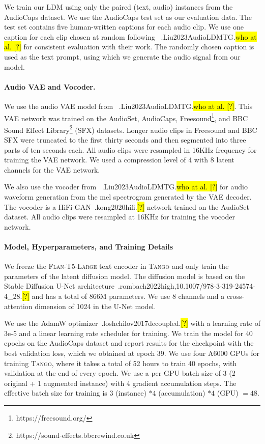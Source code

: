 \documentclass{article}
\newcommand{\model}{\textsc{Tango}}
\let\realcite\cite
\renewcommand{\cite}[1]{\ifx.#1.\hl{[?]}\else\realcite{#1}\fi}
\let\realcitet\citet
\renewcommand{\citet}[1]{\ifx.#1.\hl{who at al. [?]}\else\realcitet{#1}\fi}
\begin{document}
We train our LDM using only the paired (text, audio) instances from the AudioCaps dataset. We use the AudioCaps test set as our evaluation data. The test set contains five human-written captions for each audio clip. We use one caption for each clip chosen at random following ~\citet{Liu2023AudioLDMTG} for consistent evaluation with their work. The randomly chosen caption is used as the text prompt, using which we generate the audio signal from our model.

\paragraph{Audio VAE and Vocoder.}
We use the audio VAE model from ~\citet{Liu2023AudioLDMTG}. This VAE network was trained on the AudioSet, AudioCaps, Freesound\footnote{https://freesound.org/}, and BBC Sound Effect Library\footnote{https://sound-effects.bbcrewind.co.uk} (SFX) datasets. Longer audio clips in Freesound and BBC SFX were truncated to the first thirty seconds and then segmented into three parts of ten seconds each. All audio clips were resampled in 16KHz frequency for training the VAE network. We used a compression level of 4 with 8 latent channels for the VAE network. 

We also use the vocoder from ~\citet{Liu2023AudioLDMTG} for audio waveform generation from the mel spectrogram generated by the VAE decoder. The vocoder is a HiFi-GAN~\cite{kong2020hifi} network trained on the AudioSet dataset. All audio clips were resampled at 16KHz for training the vocoder network.

\paragraph{Model, Hyperparameters, and Training Details}
We freeze the \textsc{Flan-T5-Large} text encoder in \model{} and only train the parameters of the latent diffusion model. The diffusion model is based on the Stable Diffusion U-Net architecture~\cite{rombach2022high,10.1007/978-3-319-24574-4_28} and has a total of 866M parameters. We use 8 channels and a cross-attention dimension of 1024 in the U-Net model.

We use the AdamW optimizer~\cite{loshchilov2017decoupled} with a learning rate of 3e-5 and a linear learning rate scheduler for training. We train the model for 40 epochs on the AudioCaps dataset and report results for the checkpoint with the best validation loss, which we obtained at epoch 39. We use four A6000 GPUs for training \model{}, where it takes a total of 52 hours to train 40 epochs, with validation at the end of every epoch. We use a per GPU batch size of 3 (2 original + 1 augmented instance) with 4 gradient accumulation steps. The effective batch size for training is $3$ (instance) $* 4$ (accumulation) $* 4$ (GPU) $=48$. 
\end{document}
